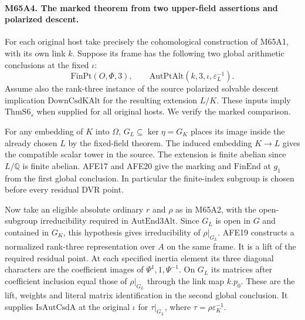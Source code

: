 \paragraph{M65A4. The marked theorem from two upper-field assertions and polarized descent.}
For each original host take precisely the cohomological construction
of M65A1, with its own link $k$. Suppose its frame has the following
two global arithmetic conclusions at the fixed $\iota$:
\[
 \mathrm{FinPt}(O,\Phi,3),\qquad
 \mathrm{AutPtAlt}(k,3,\iota,\varepsilon_L^{-1}).
\]
Assume also the rank-three instance of the source polarized solvable
descent implication $\mathrm{DownCsdKAlt}$ for the resulting
extension $L/K$. These inputs imply $\mathrm{ThmS6}_s$ when supplied
for all original hosts. We verify the marked comparison.

For any embedding of $K$ into $\Omega$, $G_L\subseteq\ker\eta=G_K$
places its image inside the already chosen $L$ by the fixed-field
theorem. The induced embedding $K\to L$ gives the compatible scalar
tower in the source. The extension is finite abelian since
$L/\mathbb Q$ is finite abelian. AFE17 and AFE20 give the marking and
$\mathrm{FinEnd}$ at $g_1$ from the first global conclusion. In
particular the finite-index subgroup is chosen before every residual
DVR point.

Now take an eligible absolute ordinary $r$ and $\rho$ as in M65A2,
with the open-subgroup irreducibility required in
$\mathrm{AutEnd3Alt}$. Since $G_L$ is open in $G$ and contained in
$G_K$, this hypothesis gives irreducibility of $\rho|_{G_L}$.
AFE19 constructs a normalized rank-three representation over $A$
on the same frame. It is a lift of the required residual point.
At each specified inertia element its three diagonal characters are
the coefficient images of $\Psi^{1},1,\Psi^{-1}$. On $G_L$ its
matrices after coefficient inclusion equal those of $\rho|_{G_L}$
through the link map $k.p_0$. These are the lift, weights and
literal matrix identification in the second global conclusion.
It supplies $\mathrm{IsAutCsdA}$ at the original $\iota$ for
$\tau|_{G_L}$, where $\tau=\rho\varepsilon_K^{-1}$.

